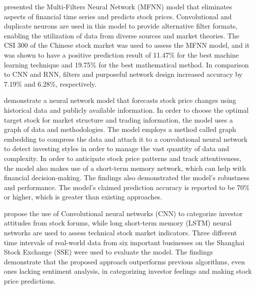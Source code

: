 \documentclass[a4paper]{article}
\begin{document}
\textbf{\cite{long2019deep}} presented the Multi-Filters Neural Network (MFNN) model that eliminates aspects of financial time series and predicts stock prices. Convolutional and duplicate neurons are used in this model to provide alternative filter formats, enabling the utilization of data from diverse sources and market theories. The CSI 300 of the Chinese stock market was used to assess the MFNN model, and it was shown to have a positive prediction result of 11.47\% for the best machine learning technique and 19.75\% for the best mathematical method. In comparison to CNN and RNN, filters and purposeful network design increased accuracy by 7.19\% and 6.28\%, respectively.

\textbf{\cite{long2020integrated}} demonstrate a neural network model that forecasts stock price changes using historical data and publicly available information. In order to choose the optimal target stock for market structure and trading information, the model uses a graph of data and methodologies. The model employs a method called graph embedding to compress the data and attach it to a convolutional neural network to detect investing styles in order to manage the vast quantity of data and complexity. In order to anticipate stock price patterns and track attentiveness, the model also makes use of a short-term memory network, which can help with financial decision-making. The findings also demonstrated the model's robustness and performance. The model's claimed prediction accuracy is reported to be 70\% or higher, which is greater than existing approaches.

\textbf{\cite{jing2021hybrid}} propose the use of Convolutional neural networks (CNN) to categorize investor attitudes from stock forums, while long short-term memory (LSTM) neural networks are used to assess technical stock market indicators. Three different time intervals of real-world data from six important businesses on the Shanghai Stock Exchange (SSE) were used to evaluate the model. The findings demonstrate that the proposed approach outperforms previous algorithms, even ones lacking sentiment analysis, in categorizing investor feelings and making stock price predictions.
\end{document}
